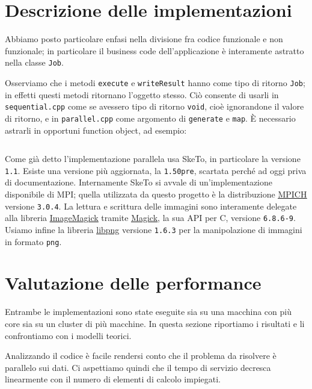 \documentclass[12pt]{article}
\newcommand{\cpp}{C\nolinebreak\hspace{-.05em}\raisebox{.4ex}{\tiny\bf +}\nolinebreak\hspace{-.10em}\raisebox{.4ex}{\tiny\bf +}}
\newcommand{\mpp}{Magick\nolinebreak\hspace{-.05em}\raisebox{.4ex}{\tiny\bf +}\nolinebreak\hspace{-.10em}\raisebox{.4ex}{\tiny\bf +}}
\begin{document}
    \section{Descrizione delle implementazioni}

    Abbiamo posto particolare enfasi nella divisione fra codice funzionale e
    non funzionale; in particolare il business code dell'applicazione è
    interamente astratto nella classe \texttt{Job}.

    Osserviamo che i metodi \texttt{execute} e \texttt{writeResult} hanno
    come tipo di ritorno \texttt{Job}; in effetti questi metodi ritornano
    l'oggetto stesso. Ciò consente di usarli in \texttt{sequential.cpp} come
    se avessero tipo di ritorno \texttt{void}, cio\`e ignorandone il valore
    di ritorno, e in \texttt{parallel.cpp} come argomento di
    \texttt{generate} e \texttt{map}. \`E necessario astrarli in opportuni
    function object, ad esempio:

    \inputminted[]{c++}{tex/src/function-object.cpp}

    Come gi\`a detto l'implementazione parallela usa SkeTo, in particolare la
    versione \texttt{1.1}. Esiste una versione pi\`u aggiornata, la
    \texttt{1.50pre}, scartata perch\'e ad oggi priva di documentazione.
    Internamente SkeTo si avvale di un'implementazione disponibile di MPI;
    quella utilizzata da questo progetto \`e la distribuzione
    \href{http://www.mpich.org}{\underline{MPICH}} versione \texttt{3.0.4}. 
    La lettura e scrittura delle immagini sono interamente delegate alla
    libreria \href{http://www.imagemagick.org/script/index.php}{\underline{ImageMagick}}
    tramite \href{http://www.imagemagick.org/script/magick++.php}{\underline{\mpp}},
    la sua API per \cpp, versione \texttt{6.8.6-9}. Usiamo infine la libreria \href{http://www.libpng.org/pub/png/libpng.html}{\underline{libpng}} versione \texttt{1.6.3} per la manipolazione di immagini in formato \texttt{png}.

    \section{Valutazione delle performance}

    Entrambe le implementazioni sono state eseguite sia su una macchina con
    pi\`u core sia su un cluster di pi\`u macchine. In questa sezione
    riportiamo i risultati e li confrontiamo con i modelli teorici.

    Analizzando il codice \`e facile rendersi conto che il problema da
    risolvere \`e parallelo sui dati. Ci aspettiamo quindi che il tempo di
    servizio decresca linearmente con il numero di elementi di calcolo
    impiegati.
\end{document}
